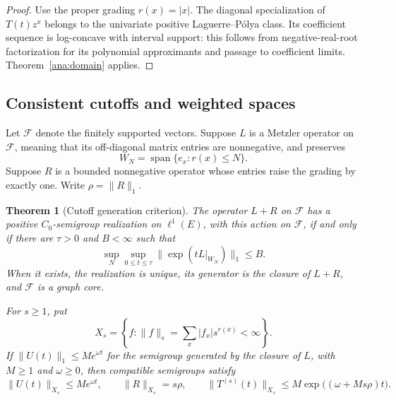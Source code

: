 \documentclass[reqno]{amsart}
\newtheorem{theorem}{Theorem}[section]
\theoremstyle{definition}
\theoremstyle{remark}
\begin{document}
\begin{proof}
Use the proper grading \(r(x)=|x|\).  The diagonal specialization of
\(T(t)z^x\) belongs to the univariate positive Laguerre--P\'olya class.
Its coefficient sequence is log-concave with interval support: this follows
from negative-real-root factorization for its polynomial approximants and
passage to coefficient limits.  Theorem~\ref{ana:domain} applies.
\end{proof}

\subsection{Consistent cutoffs and weighted spaces}

Let \(\mathcal F\) denote the finitely supported vectors.  Suppose \(L\) is
a Metzler operator on \(\mathcal F\), meaning that its off-diagonal matrix
entries are nonnegative, and preserves
\[
 W_N=\operatorname{span}\{e_x:r(x)\le N\}.
\]
Suppose \(R\) is a bounded nonnegative operator whose entries raise the
grading by exactly one.  Write \(\rho=\|R\|_1\).

\begin{theorem}[Cutoff generation criterion]\label{ana:weighted-generation}
The operator \(L+R\) on \(\mathcal F\) has a positive \(C_0\)-semigroup
realization on \(\ell^1(E)\), with this action on \(\mathcal F\), if and only
if there are \(\tau>0\) and \(B<\infty\) such that
\[
 \sup_N\sup_{0\le t\le\tau}\|\exp(tL|_{W_N})\|_1\le B.
\]
When it exists, the realization is unique, its generator is the closure of
\(L+R\), and \(\mathcal F\) is a graph core.

For \(s\ge1\), put
\[
 X_s=\left\{f:\|f\|_s=\sum_x|f_x|s^{r(x)}<\infty\right\}.
\]
If \(\|U(t)\|_1\le Me^{\omega t}\) for the semigroup generated by the closure
of \(L\), with \(M\ge1\) and \(\omega\ge0\), then compatible semigroups satisfy
\[
 \|U(t)\|_{X_s}\le Me^{\omega t},\qquad
 \|R\|_{X_s}=s\rho,\qquad
 \|T^{(s)}(t)\|_{X_s}\le
 M\exp\bigl((\omega+Ms\rho)t\bigr).
\]
\end{theorem}
\end{document}
